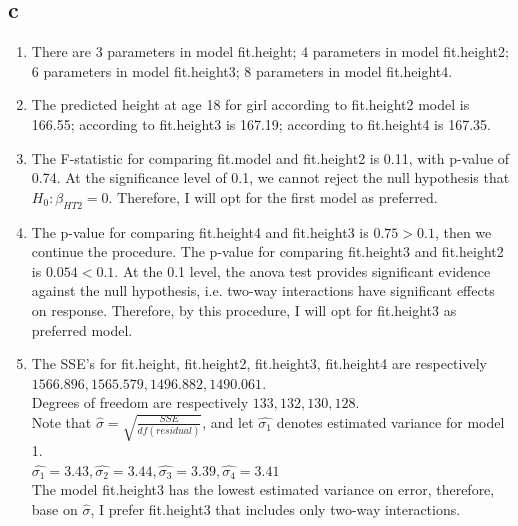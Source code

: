 \documentclass[11pt,letterpaper]{article}
\begin{document}
\subsection*{c}
\begin{enumerate}[label=\roman*.]
\item There are 3 parameters in model fit.height; 4 parameters in model fit.height2; 6 parameters in model fit.height3; 8 parameters in model fit.height4.
\item The predicted height at age 18 for girl according to fit.height2 model is 166.55; according to fit.height3 is 167.19; according to fit.height4 is 167.35. 
\item The F-statistic for comparing fit.model and fit.height2 is 0.11, with p-value of 0.74. At the significance level of 0.1, we cannot reject the null hypothesis that $H_0: \beta_{HT2} = 0$. Therefore, I will opt for the first model as preferred. 
\item The p-value for comparing fit.height4 and fit.height3 is $0.75 > 0.1$, then we continue the procedure. The p-value for comparing fit.height3 and fit.height2 is $0.054 < 0.1$. At the 0.1 level, the anova test provides significant evidence against the null hypothesis, i.e. two-way interactions have significant effects on response. Therefore, by this procedure, I will opt for fit.height3 as preferred model. 
\item The SSE's for fit.height, fit.height2, fit.height3, fit.height4 are respectively \\
$1566.896, 1565.579, 1496.882, 1490.061$.\\
Degrees of freedom are respectively $133, 132, 130, 128$. \\
Note that $\hat{\sigma} = \sqrt{\frac{SSE}{df(residual)}}$, and let $\hat{\sigma_1}$ denotes estimated variance for model 1.\\
$\hat{\sigma_1} = 3.43,  \hat{\sigma_2} = 3.44, \hat{\sigma_3} = 3.39, \hat{\sigma_4} =3.41 $ \\
The model fit.height3 has the lowest estimated variance on error, therefore, base on $\hat{\sigma}$, I prefer fit.height3 that includes only two-way interactions. 


\end{enumerate}
\end{document}
